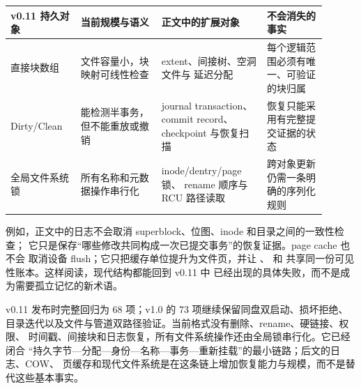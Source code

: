 \begin{longtable}{|L{0.20\linewidth}|L{0.23\linewidth}|L{0.30\linewidth}|L{0.17\linewidth}|}
\toprule
v0.11 持久对象 & 当前规模与语义 & 正文中的扩展对象 & 不会消失的事实 \\
\midrule
\endhead
直接块数组 & 文件容量小，块映射可线性检查 & extent、间接树、空洞文件与
延迟分配 & 每个逻辑范围必须有唯一、可验证的块归属 \\\tablerowrule
Dirty/Clean & 能检测半事务，但不能重放或撤销 & journal transaction、
commit record、checkpoint 与恢复扫描 & 恢复只能采用有完整提交证据的状态
\\\tablerowrule
全局文件系统锁 & 所有名称和元数据操作串行化 & inode/dentry/page 锁、
rename 顺序与 RCU 路径读取 & 跨对象更新仍需一条明确的序列化规则 \\
\bottomrule
\end{longtable}

例如，正文中的日志不会取消 superblock、位图、inode 和目录之间的一致性检查；
它只是保存“哪些修改共同构成一次已提交事务”的恢复证据。page cache 也不会
取消设备 flush；它只把缓存单位提升为文件页，并让 、
和  共享同一份可见性账本。这样阅读，现代结构都能回到 v0.11 中
已经出现的具体失败，而不是成为需要孤立记忆的新术语。

v0.11 发布时完整回归为 68 项；v1.0 的 73 项继续保留同盘双启动、损坏拒绝、
目录迭代以及文件与管道双路径验证。当前格式没有删除、rename、硬链接、权限、
时间戳、间接块和日志恢复，所有文件系统操作还由全局锁串行化。它已经闭合
“持久字节—分配—身份—名称—事务—重新挂载”的最小链路；后文的日志、COW、
页缓存和现代文件系统是在这条链上增加恢复能力与规模，而不是替代这些基本事实。
